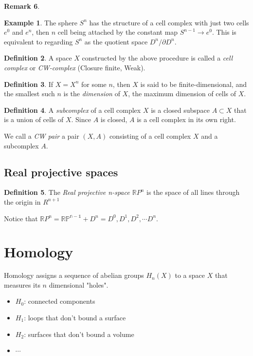 \documentclass[11pt,a4paper]{article}
\theoremstyle{definition}
\newtheorem{definition}{Definition}[section]
\newtheorem{example}[definition]{Example}
\newtheorem{remark}[definition]{Remark}
\theoremstyle{plain}
\theoremstyle{remark}
\begin{document}
\begin{remark}
\begin{example}
  The sphere $S^n$ has the structure of a cell complex with just two cells $e^0$ and $e^n$, 
  then $n$ cell being attached by the constant map $S^{n-1} \to e^0$. This is equivalent to regarding $S^n$ as 
  the quotient space $D^n / \partial D^n$. 
\end{example}
\begin{definition}
  A space $X$ constructed by the above procedure is called a \emph{cell complex} or \emph{CW-complex} (Closure finite, Weak).
\end{definition}

\begin{definition}
  If $X = X^n$ for some $n$, then $X$ is said to be finite-dimensional, and the smallest such $n$ is the \emph{dimension} of $X$, the maximum 
  dimension of cells of $X$.
\end{definition}

\begin{definition}
  A \emph{subcomplex} of a cell complex $X$ is a closed subspace $A \subset X$ that is a union of cells of $X$.
  Since $A$ is closed, $A$ is a cell complex in its own right.
  
  We call a \emph{CW pair} a pair $(X,A)$ consisting of a cell complex $X$ and a subcomplex $A$. 
\end{definition}

\subsection{Real projective spaces} 

\begin{definition}
  The \emph{Real projective n-space $\mathbb{R}P^n$} is the space of all lines through the origin in $R^{n+1}$
\end{definition}

Notice that $\mathbb{R}P^n = \mathbb{RP^{n-1}} + D^n = D^0, D^1, D^2, \cdots D^n$. 

\section{Homology}
Homology assigns a sequence of abelian groups $H_n(X)$ to a space $X$ that measures its 
$n$ dimensional "holes". 
\begin{itemize}
  \item $H_0$: connected components 
  \item $H_1$: loops that don't bound a surface 
  \item $H_2$: surfaces that don't bound a volume 
  \item $\cdots$
\end{itemize}


\end{remark}
\end{document}
